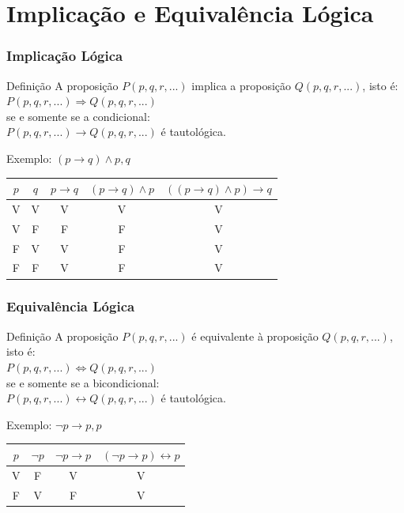 \documentclass[aspectratio=169]{beamer} %
\begin{document}
\section{Implicação e Equivalência Lógica}

\begin{frame}
\frametitle{Implicação Lógica}

\begin{block}{Definição}
A proposição $P(p, q,r, . . .)$ implica a proposição $Q(p, q,r, . . .)$, isto é:\\
$P(p, q,r, . . .) \Rightarrow Q(p, q,r, . . .)$\\
se e somente se a condicional:\\
$P(p, q,r, . . .) \rightarrow Q(p, q,r, . . .)$
é tautológica.
\end{block}\vfill

\begin{exampleblock}{Exemplo: $(p \rightarrow q) \wedge p, q$}
	\center
	\begin{tabular}{|c|c|c|c|c|}
		\hline
		$p$ & $q$ &  $p \rightarrow q$ & $(p \rightarrow q) \wedge p$ & $((p \rightarrow q) \wedge p) \rightarrow q$ \\ \hline
		V & V  & V & V &V\\ \hline
		V & F  & F  & F & V\\ \hline
        F & V  & V & F & V\\ \hline
		F & F  & V  & F& V\\ \hline
	\end{tabular}
\end{exampleblock}\vfill

\end{frame}

\begin{frame}
\frametitle{Equivalência Lógica}

\begin{block}{Definição}
A proposição $P(p, q,r, . . .)$ é equivalente à proposição $Q(p, q,r, . . .)$, isto é:\\
$P(p, q,r, . . .) \Leftrightarrow Q(p, q,r, . . .)$\\
se e somente se a bicondicional:\\
$P(p, q,r, . . .) \leftrightarrow Q(p, q,r, . . .)$
é tautológica.
\end{block}\vfill

\begin{exampleblock}{Exemplo: $\neg p \rightarrow p, p$}
	\center
	\begin{tabular}{|c|c|c|c|}
		\hline
		$p$ & $\neg p$ &  $\neg p \rightarrow p$ & $(\neg p \rightarrow p) \leftrightarrow p$  \\ \hline
		V & F  & V & V \\ \hline
		F & V  & F  & V \\ \hline
	\end{tabular}
\end{exampleblock}\vfill

\end{frame}
\end{document}
